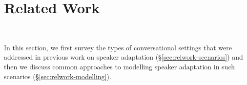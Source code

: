 
\section{Related Work}
\label{sec:related-work}

\\



In this section, we first survey the types of conversational settings that were addressed in previous work on speaker adaptation (§\ref{sec:relwork-scenarios}) and then we discuss common approaches to modelling speaker adaptation in such scenarios (§\ref{sec:relwork-modelling}).


